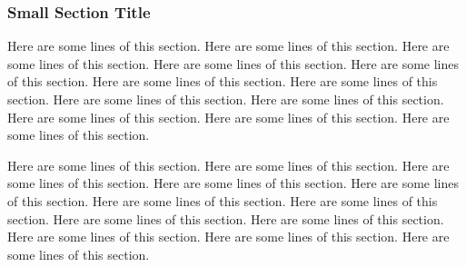 \documentclass [12pt]{article}
\begin{document}
\subsubsection*{Small Section Title}
\noindent Here are some lines of this section. Here are some lines of this section. Here are some lines of this section. Here are some lines of this section. Here are some lines of this section. Here are some lines of this section. Here are some lines of this section. Here are some lines of this section. Here are some lines of this section. Here are some lines of this section. Here are some lines of this section. Here are some lines of this section. 

Here are some lines of this section. Here are some lines of this section. Here are some lines of this section. Here are some lines of this section. Here are some lines of this section. Here are some lines of this section. Here are some lines of this section. Here are some lines of this section. Here are some lines of this section. Here are some lines of this section. Here are some lines of this section. Here are some lines of this section.


\end{document}
